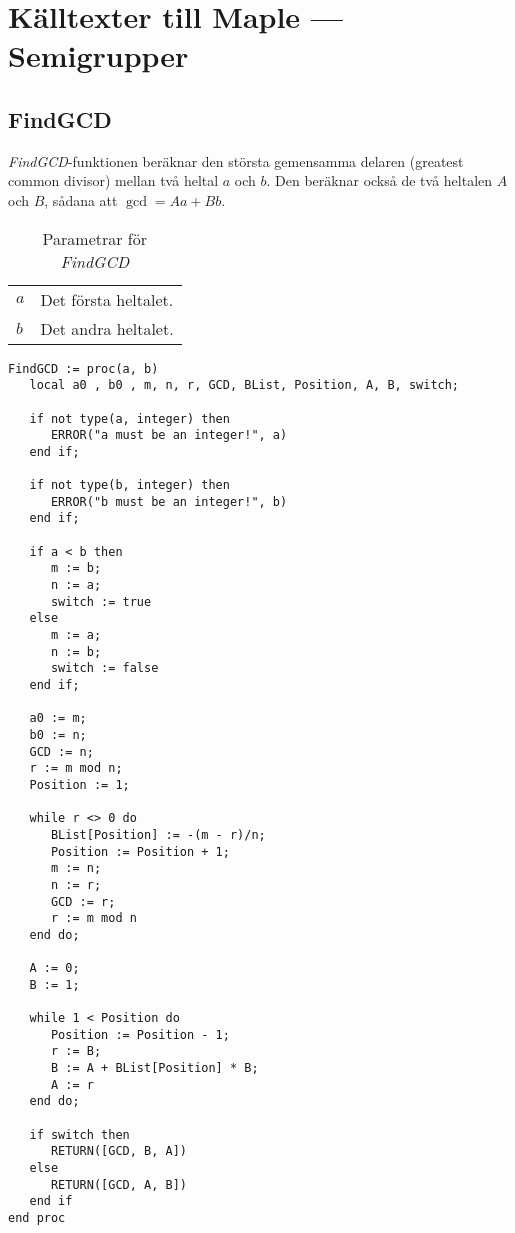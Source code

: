 \chapter[Källtexter --- Semigrupper]{Källtexter till Maple --- Semigrupper}
\label{Semigrupper}

\section{FindGCD}

\emph{FindGCD}-funktionen beräknar den största gemensamma delaren (greatest common divisor) mellan två heltal $a$ och $b$. Den beräknar också de två heltalen $A$ och $B$, sådana att $\gcd = A a + B b$.

\begin{table}[h]
\caption{Parametrar för \emph{FindGCD}}
\begin{center}
\begin{tabular}{|l|l|}
\hline
$a$ & Det första heltalet. \\
$b$ & Det andra heltalet. \\
\hline
\end{tabular}
\end{center}
\end{table}

\begin{verbatim}
FindGCD := proc(a, b)
   local a0 , b0 , m, n, r, GCD, BList, Position, A, B, switch;

   if not type(a, integer) then
      ERROR("a must be an integer!", a)
   end if;

   if not type(b, integer) then
      ERROR("b must be an integer!", b)
   end if;

   if a < b then
      m := b; 
      n := a; 
      switch := true
   else
      m := a; 
      n := b; 
      switch := false
   end if;

   a0 := m;
   b0 := n;
   GCD := n;
   r := m mod n;
   Position := 1;

   while r <> 0 do
      BList[Position] := -(m - r)/n;
      Position := Position + 1;
      m := n;
      n := r;
      GCD := r;
      r := m mod n
   end do;

   A := 0;
   B := 1;

   while 1 < Position do
      Position := Position - 1;
      r := B;
      B := A + BList[Position] * B;
      A := r
   end do;

   if switch then
      RETURN([GCD, B, A])
   else
      RETURN([GCD, A, B])
   end if
end proc
\end{verbatim}

